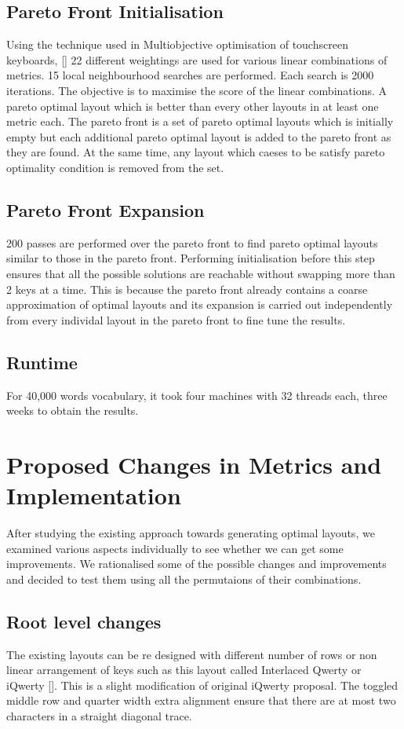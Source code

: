 \documentclass[MTech]{iitmdiss}
\begin{document}
\section{Pareto Front Initialisation}
Using the technique used in Multiobjective optimisation of touchscreen keyboards, [\cite{weighting}] 22 different weightings are used for various linear combinations of metrics.
15 local neighbourhood searches are performed. Each search is 2000 iterations.
The objective is to maximise the score of the linear combinations.
A pareto optimal layout which is better than every other layouts in at least one metric each. The pareto front is a set of pareto optimal layouts which is initially empty but each additional pareto optimal layout is added to the pareto front as they are found. At the same time, any layout which caeses to be satisfy pareto optimality condition is removed from the set. 

\section{Pareto Front Expansion}
200 passes are performed over the pareto front to find pareto optimal layouts similar to those in the pareto front.
Performing initialisation before this step ensures that all the possible solutions are reachable without swapping more than 2 keys at a time. This is because the pareto front already contains a coarse approximation of optimal layouts and its expansion is carried out independently from every individal layout in the pareto front to fine tune the results.

\section{Runtime}
For 40,000 words vocabulary, it took four machines with 32 threads each, three weeks to obtain the results.

\chapter{Proposed Changes in Metrics and Implementation}
After studying the existing approach towards generating optimal layouts, we examined various aspects individually to see whether we can get some improvements. We rationalised some of the possible changes and improvements and decided to test them using all the permutaions of their combinations.

\section{Root level changes}
The existing layouts can be re designed with different number of rows or non linear arrangement of keys such as this layout called Interlaced Qwerty or iQwerty [\cite{iqwerty}]. This is a slight modification of original iQwerty proposal. The toggled middle row and quarter width extra alignment ensure that there are at most two characters in a straight diagonal trace. 
\end{document}
